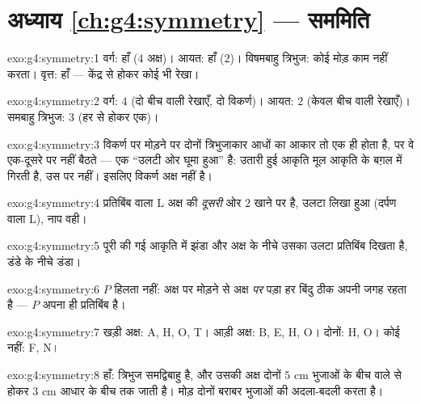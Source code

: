 \section*{अध्याय \ref{ch:g4:symmetry} --- सममिति}

\begin{solution}{exo:g4:symmetry:1}
वर्ग: हाँ ($4$ अक्ष)। आयत: हाँ ($2$)। विषमबाहु त्रिभुज: कोई
मोड़ काम नहीं करता। वृत्त: हाँ --- केंद्र से होकर कोई भी रेखा।
\end{solution}

\begin{solution}{exo:g4:symmetry:2}
वर्ग: $4$ (दो बीच वाली रेखाएँ, दो विकर्ण)। आयत: $2$ (केवल
बीच वाली रेखाएँ)। समबाहु त्रिभुज: $3$ (हर  से होकर
एक)।
\end{solution}

\begin{solution}{exo:g4:symmetry:3}
विकर्ण पर मोड़ने पर दोनों त्रिभुजाकार आधों का आकार तो एक ही होता
है, पर वे एक-दूसरे पर नहीं बैठते --- एक ``उलटी ओर घूमा हुआ''
है: उतारी हुई आकृति मूल आकृति के बग़ल में गिरती है, उस पर नहीं।
इसलिए विकर्ण अक्ष नहीं है।
\end{solution}

\begin{solution}{exo:g4:symmetry:4}
प्रतिबिंब वाला L अक्ष की \emph{दूसरी} ओर $2$ खाने पर है, उलटा
लिखा हुआ (दर्पण वाला L), नाप वही।
\end{solution}

\begin{solution}{exo:g4:symmetry:5}
पूरी की गई आकृति में झंडा और अक्ष के नीचे उसका उलटा प्रतिबिंब
दिखता है, डंडे के नीचे डंडा।
\end{solution}

\begin{solution}{exo:g4:symmetry:6}
$P$ हिलता नहीं: अक्ष पर मोड़ने से अक्ष \emph{पर} पड़ा हर बिंदु
ठीक अपनी जगह रहता है --- $P$ अपना ही प्रतिबिंब है।
\end{solution}

\begin{solution}{exo:g4:symmetry:7}
खड़ी अक्ष: A, H, O, T। आड़ी अक्ष: B, E, H, O। दोनों: H, O।
कोई नहीं: F, N।
\end{solution}

\begin{solution}{exo:g4:symmetry:8}
हाँ: त्रिभुज समद्विबाहु है, और उसकी अक्ष दोनों $5$ cm भुजाओं के
बीच वाले  से होकर $3$ cm आधार के बीच तक जाती है। मोड़ दोनों
बराबर भुजाओं की अदला-बदली करता है।
\end{solution}

